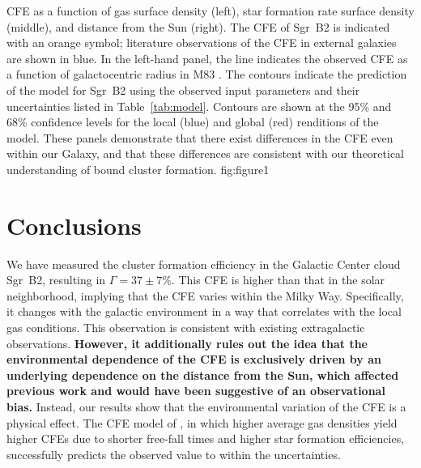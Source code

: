 \documentclass[twocolumn]{aastex62}
\def\referee#1{\textbf{#1}}
\begin{document}
{CFE as a function of gas surface density (left), star formation rate surface
density (middle), and distance from the Sun (right). The CFE of Sgr~B2 is
indicated with an orange symbol; literature observations of the CFE in
external galaxies are shown in blue. In the left-hand panel, the line indicates
the observed CFE as a function of galactocentric radius in M83
\citep{Adamo2015a}. The contours indicate the prediction of the
\citet{Kruijssen2012a} model for Sgr~B2 using the observed input parameters and
their uncertainties listed in Table~\ref{tab:model}. Contours are shown at the
95\% and 68\% confidence levels for the local (blue) and global (red)
renditions of the model. These panels demonstrate that there exist differences
in the CFE even within our Galaxy, and that these differences are consistent
with our theoretical understanding of bound cluster formation. 
}
{fig:figure}{1}{\textwidth}

\section{Conclusions}
We have measured the cluster formation efficiency in the Galactic Center cloud
Sgr~B2, resulting in $\Gamma=37\pm7\%$. This CFE is higher than that in the solar
neighborhood, implying that the CFE varies within the Milky Way. Specifically,
it changes with the galactic environment in a way that correlates with the
local gas conditions. This observation is consistent with existing extragalactic
observations.  \referee{However, it additionally rules out the idea that the
environmental dependence of the CFE is exclusively driven by an underlying
dependence on the distance from the Sun, which affected previous work and would have
been suggestive of an observational bias.} Instead, our results show that the
environmental variation of the CFE is a physical effect. The CFE model of
\citet{Kruijssen2012a}, in which higher average gas densities yield higher CFEs
due to shorter free-fall times and higher star formation efficiencies,
successfully predicts the observed value to within the uncertainties.


\end{document}
